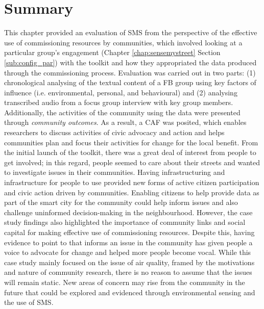 \section{Summary}
This chapter provided an evaluation of SMS from the perspective of the effective use of commissioning resources by communities, which involved looking at a particular group's engagement (Chapter \ref{chap:sensemystreet} Section \ref{sub:config_par}) with the toolkit and how they appropriated the data produced through the commissioning process. Evaluation was carried out in two parts: (1) chronological analysing of the textual content of a FB group using key factors of influence (i.e. environmental, personal, and behavioural) and (2) analysing transcribed audio from a focus group interview with key group members. Additionally, the activities of the community using the data were presented through \textit{community outcomes}. As a result, a CAF was posited, which enables researchers to discuss activities of civic advocacy and action and helps communities plan and focus their activities for change for the local benefit. From the initial launch of the toolkit, there was a great deal of interest from people to get involved; in this regard, people seemed to care about their streets and wanted to investigate issues in their communities. Having infrastructuring and infrastructure for people to use provided new forms of active citizen participation and civic action driven by communities. Enabling citizens to help provide data as part of the smart city for the community could help inform issues and also challenge uninformed decision-making in the neighbourhood. However, the case study findings also highlighted the importance of community links and social capital for making effective use of commissioning resources. Despite this, having evidence to point to that informs an issue in the community has given people a voice to advocate for change and helped more people become vocal. While this case study mainly focused on the issue of air quality, framed by the motivations and nature of community research, there is no reason to assume that the issues will remain static. New areas of concern may rise from the community in the future that could be explored and evidenced through environmental sensing and the use of SMS.